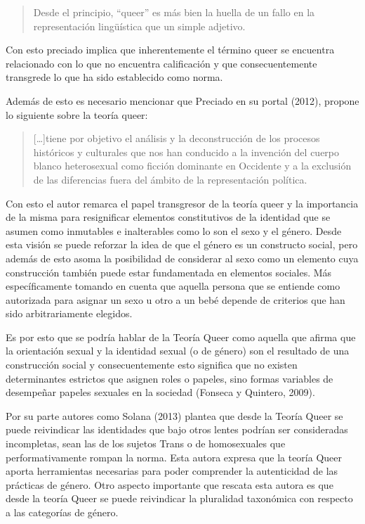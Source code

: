 \begin{quote}
    Desde el principio, “queer” es más bien la huella de un fallo en la
    representación lingüística que un simple adjetivo.
\end{quote}

Con esto preciado implica que inherentemente el término queer se encuentra
relacionado con lo que no encuentra calificación y que consecuentemente
transgrede lo que ha sido establecido como norma.

Además de esto es necesario mencionar que Preciado en su portal (2012),
propone lo siguiente sobre la teoría queer:

\begin{quote}
    […]tiene por objetivo el análisis y la deconstrucción de los procesos históricos
    y culturales que nos han conducido a la invención del cuerpo blanco
    heterosexual como ficción dominante en Occidente y a la exclusión de las
    diferencias fuera del ámbito de la representación política.
\end{quote}

Con esto el autor remarca el papel transgresor de la teoría queer y la
importancia de la misma para resignificar elementos constitutivos de la
identidad que se asumen como inmutables e inalterables como lo son el sexo y el
género.
Desde esta visión se puede reforzar la idea de que el género es un constructo
social, pero además de esto asoma la posibilidad de considerar al sexo como un
elemento cuya construcción también puede estar fundamentada en elementos
sociales.
Más específicamente tomando en cuenta que aquella persona que se
entiende como autorizada para asignar un sexo u otro a un bebé depende de
criterios que han sido arbitrariamente elegidos.

Es por esto que se podría hablar de la Teoría Queer como aquella que afirma que
la orientación sexual y la identidad sexual (o de género) son el resultado de
una construcción social y consecuentemente esto significa que no existen
determinantes estrictos que asignen roles o papeles, sino formas variables de
desempeñar papeles sexuales en la sociedad (Fonseca y Quintero, 2009).

Por su parte autores como Solana (2013) plantea que desde la Teoría Queer se
puede reivindicar las identidades que bajo otros lentes podrían ser consideradas
incompletas, sean las de los sujetos Trans o de homosexuales que
performativamente rompan la norma.
Esta autora expresa que la teoría Queer aporta herramientas necesarias para
poder comprender la autenticidad de las prácticas de género.
Otro aspecto importante que rescata esta autora es que desde la teoría Queer se
puede reivindicar la pluralidad taxonómica con respecto a las categorías de
género.

